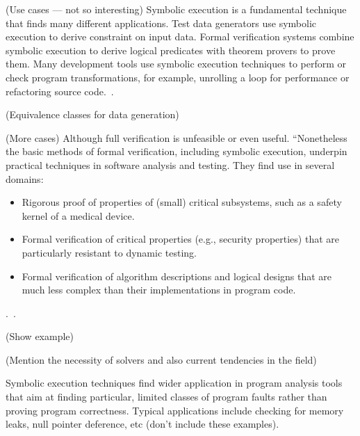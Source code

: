 (Use cases --- not so interesting) Symbolic execution is a fundamental technique that finds many different applications. Test data generators use symbolic execution to derive constraint on input data. Formal verification systems combine symbolic execution to derive logical predicates with theorem provers to prove them. Many development tools use symbolic execution techniques to perform or check program transformations, for example, unrolling a loop for performance or refactoring source code.~\cite{BookPezze2008}. 

(Equivalence classes for data generation)

(More cases) Although full verification is unfeasible or even useful. ``Nonetheless the basic methods of formal verification, including symbolic execution, underpin practical techniques in software analysis and testing. They find use in several domains:

\begin{itemize}
	\item Rigorous proof of properties of (small) critical subsystems, such as a safety kernel of a medical device.
	\item Formal verification of critical properties (e.g., security properties) that are particularly resistant to dynamic testing.
	\item Formal verification of algorithm descriptions and logical designs that are much less complex than their implementations in program code.
\end{itemize}.~\cite{BookPezze2008}.
 
(Show example)

(Mention the necessity of solvers and also current tendencies in the field)

Symbolic execution techniques find wider application in program analysis tools that aim at finding particular, limited classes of program faults rather than proving program correctness. Typical applications include checking for memory leaks, null pointer deference, etc (don't include these examples).~\cite{BookPezze2008}



